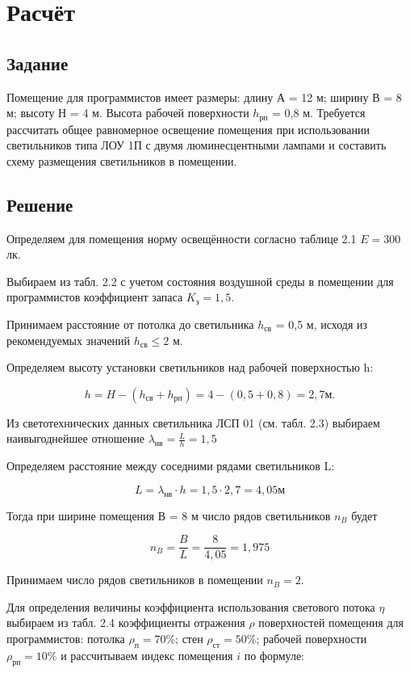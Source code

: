 \chapter{Расчёт}

\section{Задание}
Помещение для программистов имеет размеры: длину А = 12 м; ширину В = 8 м; высоту Н = 4 м. Высота рабочей поверхности $h_{\text{рп}}$ = 0,8 м. Требуется рассчитать общее равномерное освещение помещения при использовании светильников типа ЛОУ 1П с двумя люминесцентными лампами и составить схему размещения светильников в помещении.

\section{Решение}

Определяем для помещения норму освещённости согласно таблице 2.1 $E = 300$ лк.

Выбираем из табл. 2.2 с учетом состояния воздушной среды в помещении для программистов коэффициент запаса $K_{\text{з}} = 1,5$.

Принимаем расстояние от потолка до светильника $h_{\text{св}}$ = 0,5 м, исходя из рекомендуемых значений $h_{\text{св}} \le 2 $ м.

Определяем высоту установки светильников над рабочей поверхностью h: 

\[
h =  H - ( h_{\text{св}} + h_{\text{рп}} ) = 4 - (0,5 + 0,8) = 2,7 \text{м}.
\]

Из светотехнических данных светильника ЛСП 01 (см. табл. 2.3) выбираем наивыгоднейшее отношение $\lambda_\text{нв}=\frac{L}{h}=1,5$

Определяем расстояние между соседними рядами светильников L:

\[
L=\lambda_\text{нв} \cdot h=1,5 \cdot 2,7 = 4,05 \text{м}
\]

Тогда при ширине помещения В = 8 м число рядов светильников $n_{B}$ будет

\[
n_{B} = \frac{B}{L}=\frac{8}{4,05}=1,975
\]

Принимаем число рядов светильников в помещении $n_{B} = 2$.

Для определения величины коэффициента использования светового потока $\eta$ выбираем из табл. 2.4 коэффициенты отражения $\rho$ поверхностей помещения для программистов: потолка $\rho_\text{п} = 70\% $; стен $\rho_\text{ст} = 50\%$; рабочей поверхности $\rho_\text{рп} = 10 \%$ и рассчитываем индекс помещения $i$ по формуле:

